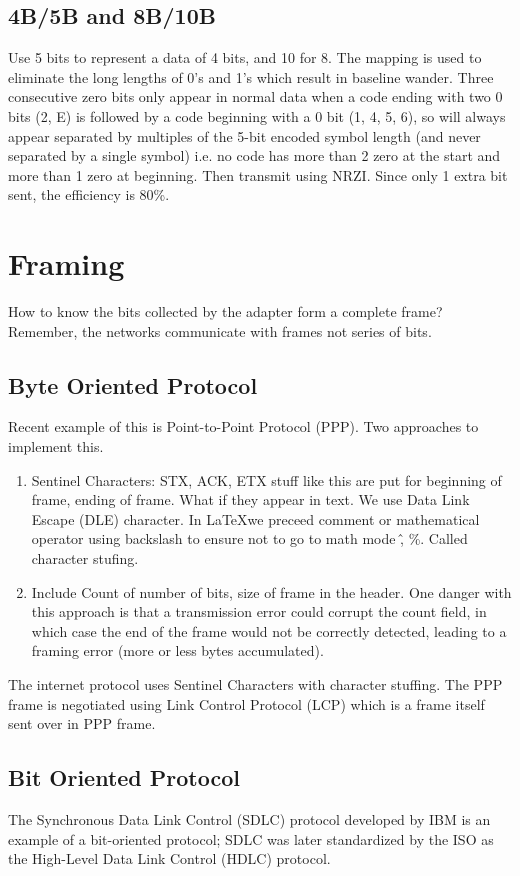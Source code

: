 \documentclass[12pt]{book}
\begin{document}
\subsection{4B/5B and 8B/10B}
Use 5 bits to represent a data of 4 bits, and 10 for 8. The mapping is used to eliminate the long lengths of 0's and 1's which result in baseline wander. Three consecutive zero bits only appear in normal data when a code ending with two 0 bits (2, E) is followed by a code beginning with a 0 bit (1, 4, 5, 6), so will always appear separated by multiples of the 5-bit encoded symbol length (and never separated by a single symbol) i.e. no code has more than 2 zero at the start and more than 1 zero at beginning. Then transmit using NRZI. Since only 1 extra bit sent, the efficiency is 80\%.

\section{Framing}
How to know the bits collected by the adapter form a complete frame? Remember, the networks communicate with frames not series of bits.
\subsection{Byte Oriented Protocol}
Recent example of this is Point-to-Point Protocol (PPP). Two approaches to implement this.
\begin{enumerate}
    \item Sentinel Characters: STX, ACK, ETX stuff like this are put for beginning of frame, ending of frame. What if they appear in text. We use Data Link Escape (DLE) character. In \LaTeX we preceed comment or mathematical operator using backslash to ensure not to go to math mode \^, \%. Called character stufing.
    \item Include Count of number of bits, size of frame in the header. One danger with this approach is that a transmission error could corrupt the count field, in which case the end of the frame would not be correctly detected, leading to a framing error (more or less bytes accumulated).
\end{enumerate}
The internet protocol uses Sentinel Characters with character stuffing. The PPP frame is negotiated using Link Control Protocol (LCP) which is a frame itself sent over in PPP frame.

\subsection{Bit Oriented Protocol}
The Synchronous Data Link Control (SDLC) protocol developed by IBM is an example of a bit-oriented protocol; SDLC was later standardized by the ISO as the High-Level Data Link Control (HDLC) protocol.\\
\end{document}
